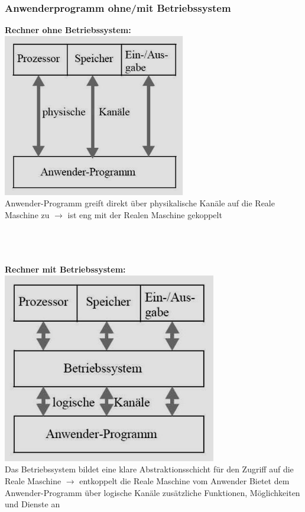 \subsubsection{Anwenderprogramm ohne/mit Betriebssystem}
\begin{minipage}{0.5\textwidth}
    \textbf{Rechner ohne Betriebssystem:}\\
    \includegraphics[width=0.6\textwidth]{images/Betriebssysteme/Rechner_ohne_Betriebssystem.png} \\
        Anwender-Programm greift direkt über physikalische Kanäle auf die Reale Maschine zu $\rightarrow$ ist eng mit der Realen Maschine gekoppelt \\ \\ \\ \\
\end{minipage}
\hfill
\begin{minipage}{0.45\textwidth}
    \textbf{Rechner mit Betriebssystem:}\\
    \includegraphics[width=0.7\textwidth]{images/Betriebssysteme/Rechner_mit_Betriebssystem.png} \\
        Das Betriebssystem bildet eine klare Abstraktionsschicht für den Zugriff auf die Reale Maschine $\rightarrow$ entkoppelt die Reale Maschine vom Anwender
        Bietet dem Anwender-Programm über logische Kanäle zusätzliche Funktionen, Möglichkeiten und Dienste an
\end{minipage}

